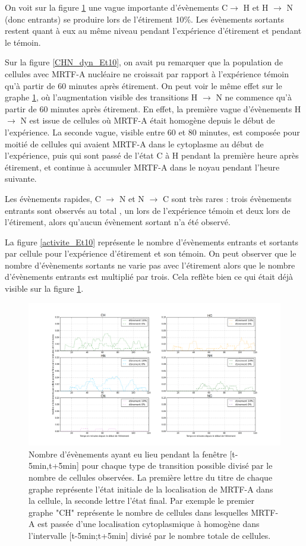 On voit sur la figure \ref{transloc_dyn_Et10} une vague importante d'évènements C$\rightarrow$ H et H $\rightarrow$ N (donc entrants) se produire lors de l'étirement 10\%. Les évènements sortants restent quant à eux au même niveau pendant l'expérience d'étirement et pendant le témoin. 

Sur la figure \ref{CHN_dyn_Et10}, on avait pu remarquer que la population de cellules avec MRTF-A nucléaire ne croissait par rapport à l'expérience témoin qu'à partir de 60 minutes après étirement. On peut voir le même effet sur le graphe \ref{transloc_dyn_Et10}, où l'augmentation visible des transitions H $\rightarrow$ N ne commence qu'à partir de 60 minutes après étirement. 
En effet, la première vague d'évènements H $\rightarrow$ N est issue de cellules où MRTF-A était homogène depuis le début de l'expérience. La seconde vague, visible entre 60 et 80 minutes, est composée pour moitié de cellules qui avaient MRTF-A dans le cytoplasme au début de l'expérience, puis qui sont passé de l'état C à H pendant la première heure après étirement, et continue à accumuler MRTF-A dans le noyau pendant l'heure suivante. 

Les évènements rapides, C $\rightarrow$ N et N $\rightarrow$ C sont très rares : trois évènements entrants sont observés au total , un lors de l'expérience témoin et deux lors de l'étirement, alors qu'aucun évènement sortant n'a été observé. 

La figure \ref{activite_Et10} représente le nombre d'évènements entrants et sortants par cellule pour l'expérience d'étirement et son témoin. 
On peut observer que le nombre d'évènements sortants ne varie pas avec l'étirement alors que le nombre d'évènements entrants est multiplié par trois. Cela reflète bien ce qui était déjà visible sur la figure \ref{transloc_dyn_Et10}. 

\begin{figure}
\includegraphics[scale=0.33]{Figures/Etirement10_vs_0_translocations.png} 
\caption{\label{transloc_dyn_Et10} Nombre d'évènements ayant eu lieu pendant la fenêtre [t-5min,t+5min] pour chaque type de transition possible divisé par le nombre de cellules observées. La première lettre du titre de chaque graphe représente l'état initiale de la localisation de MRTF-A dans la cellule, la seconde lettre l'état final. Par exemple le premier graphe "CH" représente le nombre de cellules dans lesquelles MRTF-A est passée d'une localisation cytoplasmique à homogène dans l'intervalle [t-5min;t+5min] divisé par le nombre totale de cellules.}
\end{figure}


